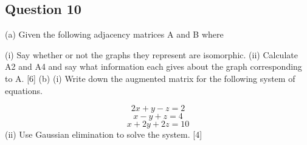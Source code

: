 \documentclass{article}
\begin{document}
\subsection*{Question 10}

(a) Given the following adjacency matrices A and B where
%
%
%



(i) Say whether or not the graphs they represent are isomorphic.
(ii) Calculate A2 and A4 and say what information each gives about the graph
corresponding to A. [6]
(b) (i) Write down the augmented matrix for the following system of equations.

\[2x + y - z = 2\]
\[x - y + z = 4\]
\[x + 2y + 2z = 10\]
(ii) Use Gaussian elimination to solve the system. [4]
\end{document}
